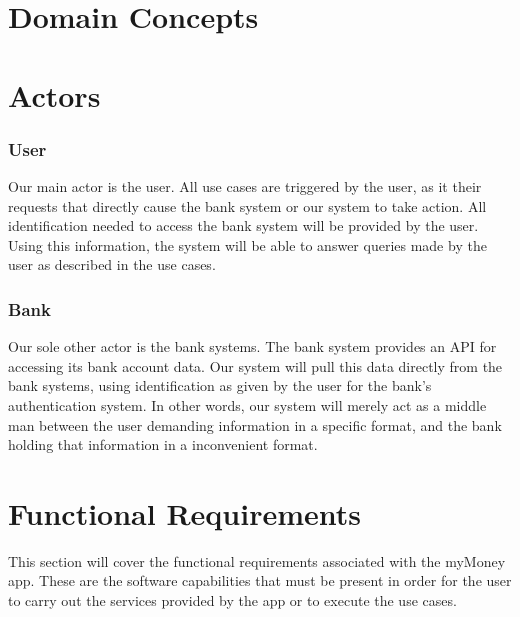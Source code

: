 \documentclass[11pt]{article}
\newcounter{use case ID}
\begin{document}
\section{Domain Concepts}




\clearpage
\section{Actors}
\subsubsection{User}
Our main actor is the user. All use cases are triggered by the user, as it their requests that directly cause the bank system or our system to take action. All identification needed to access the bank system will be provided by the user. Using this information, the system will be able to answer queries made by the user as described in the use cases.
\subsubsection{Bank}
Our sole other actor is the bank systems. The bank system provides an API for accessing its bank account data. Our system will pull this data directly from the bank systems, using identification as given by the user for the bank's authentication system. In other words, our system will merely act as a middle man between the user demanding information in a specific format, and the bank holding that information in a inconvenient format.

\section{Functional Requirements}

This section will cover the functional requirements associated with the myMoney app. These are the software
capabilities that must be present in order for the user to carry out the services provided by the app
or to execute the use cases. 
\end{document}

